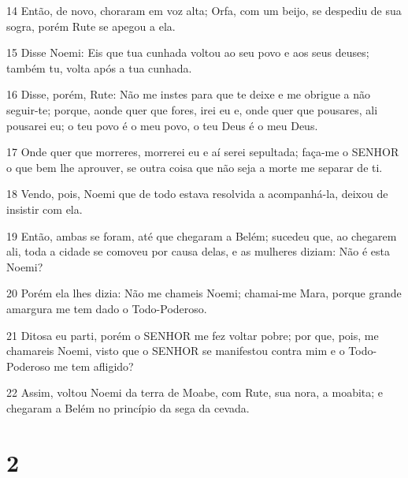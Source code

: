 \par 14 Então, de novo, choraram em voz alta; Orfa, com um beijo, se despediu de sua sogra, porém Rute se apegou a ela.
\par 15 Disse Noemi: Eis que tua cunhada voltou ao seu povo e aos seus deuses; também tu, volta após a tua cunhada.
\par 16 Disse, porém, Rute: Não me instes para que te deixe e me obrigue a não seguir-te; porque, aonde quer que fores, irei eu e, onde quer que pousares, ali pousarei eu; o teu povo é o meu povo, o teu Deus é o meu Deus.
\par 17 Onde quer que morreres, morrerei eu e aí serei sepultada; faça-me o SENHOR o que bem lhe aprouver, se outra coisa que não seja a morte me separar de ti.
\par 18 Vendo, pois, Noemi que de todo estava resolvida a acompanhá-la, deixou de insistir com ela.
\par 19 Então, ambas se foram, até que chegaram a Belém; sucedeu que, ao chegarem ali, toda a cidade se comoveu por causa delas, e as mulheres diziam: Não é esta Noemi?
\par 20 Porém ela lhes dizia: Não me chameis Noemi; chamai-me Mara, porque grande amargura me tem dado o Todo-Poderoso.
\par 21 Ditosa eu parti, porém o SENHOR me fez voltar pobre; por que, pois, me chamareis Noemi, visto que o SENHOR se manifestou contra mim e o Todo-Poderoso me tem afligido?
\par 22 Assim, voltou Noemi da terra de Moabe, com Rute, sua nora, a moabita; e chegaram a Belém no princípio da sega da cevada.

\chapter{2}

